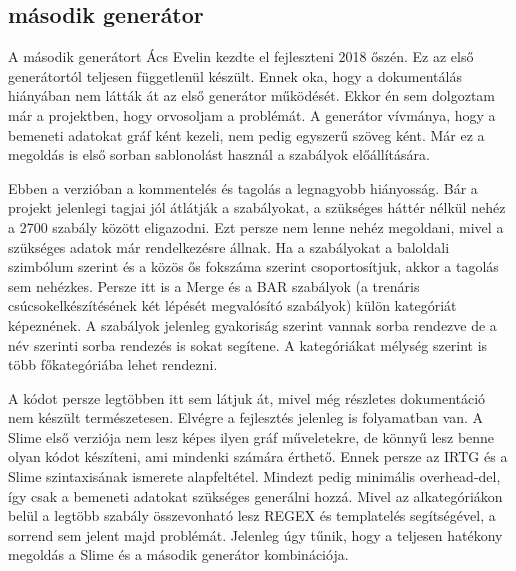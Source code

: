 \subsection{második generátor}
A második generátort Ács Evelin kezdte el fejleszteni 2018 őszén.
Ez az első generátortól teljesen függetlenül készült.
Ennek oka, hogy a dokumentálás hiányában nem látták át az első generátor működését.
Ekkor én sem dolgoztam már a projektben, hogy orvosoljam a problémát.
A generátor vívmánya, hogy a bemeneti adatokat gráf ként kezeli, nem pedig egyszerű szöveg ként.
Már ez a megoldás is első sorban sablonolást használ a szabályok előállítására.

Ebben a verzióban a kommentelés és tagolás a legnagyobb hiányosság. 
Bár a projekt jelenlegi tagjai jól átlátják a szabályokat, a szükséges háttér nélkül nehéz a 2700 szabály között eligazodni. 
Ezt persze nem lenne nehéz megoldani, mivel a szükséges adatok már rendelkezésre állnak. 
Ha a szabályokat a baloldali szimbólum szerint és a közös ős fokszáma szerint csoportosítjuk, akkor a tagolás sem nehézkes. 
Persze itt is a Merge és a BAR szabályok (a trenáris csúcsokelkészítésének két lépését megvalósító szabályok) külön kategóriát képeznének. 
A szabályok jelenleg gyakoriság szerint vannak sorba rendezve de a név szerinti sorba rendezés is sokat segítene. 
A kategóriákat mélység szerint is több főkategóriába lehet rendezni.

A kódot persze legtöbben itt sem látjuk át, mivel még részletes dokumentáció nem készült természetesen.
Elvégre a fejlesztés jelenleg is folyamatban van. 
A Slime első verziója nem lesz képes ilyen gráf műveletekre, de könnyű lesz benne olyan kódot készíteni, ami mindenki számára érthető.
Ennek persze az IRTG és a Slime szintaxisának ismerete alapfeltétel. 
Mindezt pedig minimális overhead-del, így csak a bemeneti adatokat szükséges generálni hozzá. 
Mivel az alkategóriákon belül a legtöbb szabály összevonható lesz REGEX és templatelés segítségével, a sorrend sem jelent majd problémát.
Jelenleg úgy tűnik, hogy a teljesen hatékony megoldás a Slime és a második generátor kombinációja.